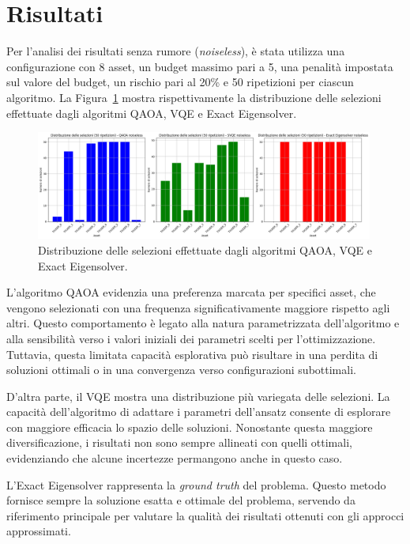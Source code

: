 \section{Risultati}\label{sec:results}

Per l'analisi dei risultati senza rumore (\textit{noiseless}), è stata utilizza
una configurazione con 
8 asset, un budget massimo pari a 5, una penalità impostata sul valore del budget, 
un rischio pari al 20\% e 50 ripetizioni per ciascun algoritmo. 
La Figura~\ref{fig:noiseless-risultati-1} mostra rispettivamente la distribuzione 
delle selezioni effettuate dagli algoritmi QAOA, VQE e Exact Eigensolver.

\begin{figure}[ht!]
    \centering
    \includegraphics[width=0.99\textwidth]{images/risultati/noiseless-risultati-1.png}
    \caption{Distribuzione delle selezioni effettuate dagli algoritmi QAOA, VQE e Exact Eigensolver.}
    \label{fig:noiseless-risultati-1}
\end{figure}

L'algoritmo QAOA evidenzia una preferenza marcata per specifici asset, che vengono 
selezionati con una frequenza significativamente maggiore rispetto agli altri. 
Questo comportamento è legato alla natura parametrizzata dell'algoritmo e alla 
sensibilità verso i valori iniziali dei parametri scelti per l'ottimizzazione. 
Tuttavia, questa limitata capacità esplorativa può risultare in una perdita di 
soluzioni ottimali o in una convergenza verso configurazioni subottimali.

D'altra parte, il VQE mostra una distribuzione più variegata delle selezioni. 
La capacità dell'algoritmo di adattare i parametri dell'ansatz consente di 
esplorare con maggiore efficacia lo spazio delle soluzioni. Nonostante questa 
maggiore diversificazione, i risultati non sono sempre allineati con quelli 
ottimali, evidenziando che alcune incertezze permangono anche in questo caso.

L'Exact Eigensolver rappresenta la \textit{ground truth} del problema. Questo 
metodo fornisce sempre la soluzione esatta e ottimale del problema, servendo 
da riferimento principale per valutare la qualità dei risultati ottenuti con 
gli approcci approssimati.

